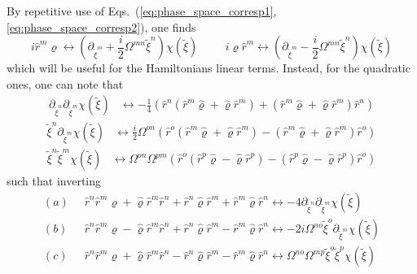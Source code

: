 \documentclass[%
reprint,
superscriptaddress,
nofootinbib,
 amsmath,amssymb,
prx,
floatfix,
]{revtex4-2}
\begin{document}
By repetitive use of Eqs.~(\ref{eq:phase_space_corresp1},\ref{eq:phase_space_corresp2}), one finds 
\begin{equation}
\label{eq:map_chara_first}
   i \hat{r}^m \hat{\varrho}  \longleftrightarrow  \left(  \partial_{\tilde{\xi}^m} + \frac{i}{2} \Omega^{mn} \tilde{\xi}^n \right) \chi (\tilde{\xi}) \hspace{1cm}  i  \hat{\varrho} \hat{r}^m \longleftrightarrow  \left(  \partial_{\tilde{\xi}^m} - \frac{i}{2} \Omega^{mn} \tilde{\xi}^n \right) \chi (\tilde{\xi})
\end{equation}
which will be useful for the Hamiltonians linear terms. Instead, for the quadratic ones, one can note that  
\begin{align*}
     \partial_{\tilde{\xi}^n} \partial_{\tilde{\xi}^m} \chi (\tilde{\xi}) &\longleftrightarrow  - \frac{1}{4} \left(\hat{r}^n ( \hat{r}^m  \hat{\varrho} + \hat{\varrho} \hat{r}^m  ) +  (\hat{r}^m  \hat{\varrho} + \hat{\varrho} \hat{r}^m ) \hat{r}^n  \right)  
\end{align*}
\begin{align*}
    \tilde{\xi}^n \partial_{\tilde{\xi}^m} \chi (\tilde{\xi}) &\longleftrightarrow  \frac{i}{2} \Omega^{on} \left(\hat{r}^o ( \hat{r}^m  \hat{\varrho} + \hat{\varrho} \hat{r}^m  ) -  (\hat{r}^m  \hat{\varrho} + \hat{\varrho} \hat{r}^m ) \hat{r}^o  \right)  
\end{align*}
\begin{align*}
    \tilde{\xi}^n \tilde{\xi}^m \chi (\tilde{\xi}) &\longleftrightarrow  \Omega^{on} \Omega^{pm} \left(\hat{r}^o ( \hat{r}^p  \hat{\varrho} - \hat{\varrho} \hat{r}^p  ) -  (\hat{r}^p  \hat{\varrho} - \hat{\varrho} \hat{r}^p ) \hat{r}^o  \right) 
\end{align*}
such that inverting 
\begin{align*}
     (a) & \;\; \hat{r}^n  \hat{r}^m  \hat{\varrho} + \hat{\varrho} \hat{r}^m  \hat{r}^n + \hat{r}^n  \hat{\varrho}  \hat{r}^m  +  \hat{r}^m  \hat{\varrho} \hat{r}^n \longleftrightarrow   - 4 \partial_{\tilde{\xi}^n} \partial_{\tilde{\xi}^m} \chi (\tilde{\xi})  \\
      (b) & \;\; \hat{r}^n  \hat{r}^m  \hat{\varrho} - \hat{\varrho} \hat{r}^m  \hat{r}^n + \hat{r}^n  \hat{\varrho}  \hat{r}^m  -  \hat{r}^m  \hat{\varrho} \hat{r}^n   \longleftrightarrow   - 2 i \Omega^{n o} \tilde{\xi}^o  \partial_{\tilde{\xi}^m} \chi (\tilde{\xi}) \\
       (c) &\;\; \hat{r}^n  \hat{r}^m  \hat{\varrho} + \hat{\varrho} \hat{r}^m  \hat{r}^n -  \hat{r}^n  \hat{\varrho}  \hat{r}^m  -  \hat{r}^m  \hat{\varrho} \hat{r}^n    \longleftrightarrow \Omega^{n o} \Omega^{m p} \tilde{\xi}^o \tilde{\xi}^p \chi (\tilde{\xi}) 
\end{align*}
\end{document}
